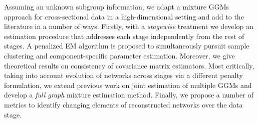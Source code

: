 \documentclass[10pt]{article}
\begin{document}


\medskip
Assuming an unknown subgroup information, we adapt a mixture GGMs approach for cross-sectional data in a high-dimensional setting and add to the literature in a number of ways. Firstly, with a \textit{stagewise} treatment we develop an estimation procedure that addresses each stage independently from the rest of stages. A penalized EM algorithm is proposed to simultaneously pursuit sample clustering and component-specific parameter estimation. Moreover, we give theoretical results on consistency of covariance matrix estimators. Most critically, taking into account evolution of networks across stages via a different penalty formulation, we extend previous work on joint estimation of multiple GGMs and develop a \textit{full graph} mixture estimation method. Finally, we propose a number of metrics to identify changing elements of reconstructed networks over the data stage.   
\end{document}
